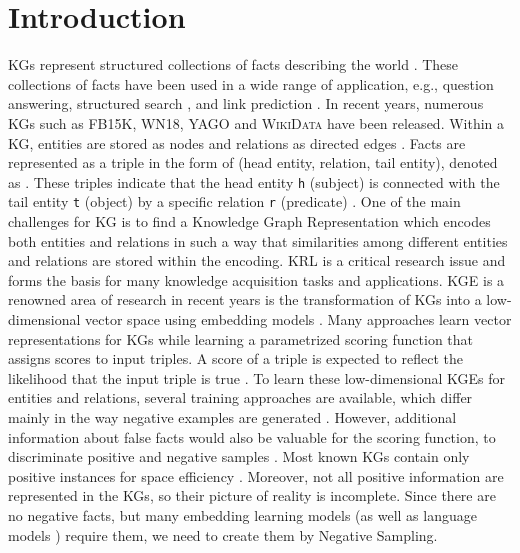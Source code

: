 \chapter{Introduction}
\label{ch:introduction}

\acp{KG} represent structured collections of facts describing the world   \cite{hogan2020knowledge}.
These collections of facts have been used in a wide range of application, e.g., question answering, structured search \cite{zhang2019nscaching}, and link prediction \cite{cai2017kbgan, Alam2020AffinityDN}.
In recent years, numerous \acp{KG} such as \textsc{FB15K}, \textsc{WN18}, \textsc{YAGO} \cite{ConEx} and \textsc{WikiData} \cite{arnaoutwikinegata} have been released.
Within a \ac{KG}, entities are stored as nodes and relations as directed edges \cite{zhang2019nscaching}.
Facts are represented as a triple in the form of (head entity, relation, tail entity), denoted as .
These triples indicate that the head entity \texttt{h} (subject) is connected with the tail entity \texttt{t} (object) by a specific relation \texttt{r} (predicate) \cite{zhang2019nscaching, Alam2020AffinityDN}.
One of the main challenges for \ac{KG} is to find a Knowledge Graph Representation which encodes both entities and relations in such a way that similarities among different entities and relations are stored within the encoding. 
\ac{KRL} is a critical research issue and forms the basis for many knowledge acquisition tasks and applications.
\ac{KGE} is a renowned area of research in recent years is the transformation of \acp{KG} into a low-dimensional vector space using embedding models \cite{Alam2020AffinityDN}.
Many approaches learn vector representations for \acp{KG} while learning a parametrized scoring function that assigns scores to input triples.
A score of a triple is expected to reflect the likelihood that the input triple is true \cite{ConvE, qiannegative}.
To learn these low-dimensional \acp{KGE} for entities and relations, several training approaches are available, which differ mainly in the way negative examples are generated \cite{Ruffinelli2020You}. 
However, additional information about false facts would also be valuable for the scoring function, to discriminate positive and negative samples \cite{qiannegative}.
Most known \acp{KG} contain only positive instances for space efficiency \cite{qiannegative}.
Moreover, not all positive information are represented in the \acp{KG}, so their picture of reality is incomplete.
Since there are no negative facts, but many embedding learning models (as well as language models \cite{MikolovSCCD13}) require them, we need to create them by Negative Sampling.

